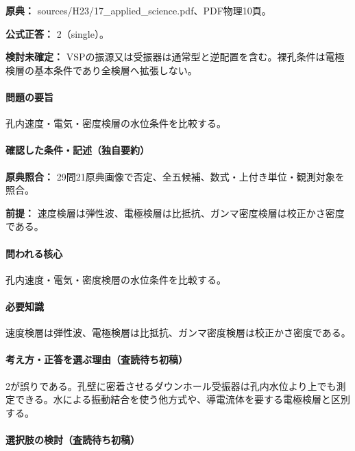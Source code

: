 \noindent\textbf{原典：} sources/H23/17\_applied\_science.pdf、PDF物理10頁。

\textbf{公式正答：} 2（single）。

\par\textbf{検討未確定：} VSPの振源又は受振器は通常型と逆配置を含む。裸孔条件は電極検層の基本条件であり全検層へ拡張しない。

\paragraph{問題の要旨} 孔内速度・電気・密度検層の水位条件を比較する。

\paragraph{確認した条件・記述（独自要約）}\mbox{}\par

\noindent\textbf{原典照合：} 29問21原典画像で否定、全五候補、数式・上付き単位・観測対象を照合。\par

\noindent\textbf{前提：} 速度検層は弾性波、電極検層は比抵抗、ガンマ密度検層は校正かさ密度である。\par

\paragraph{問われる核心} 孔内速度・電気・密度検層の水位条件を比較する。

\paragraph{必要知識} 速度検層は弾性波、電極検層は比抵抗、ガンマ密度検層は校正かさ密度である。

\paragraph{考え方・正答を選ぶ理由（査読待ち初稿）} 2が誤りである。孔壁に密着させるダウンホール受振器は孔内水位より上でも測定できる。水による振動結合を使う他方式や、導電流体を要する電極検層と区別する。

\paragraph{選択肢の検討（査読待ち初稿）}\mbox{}\par

